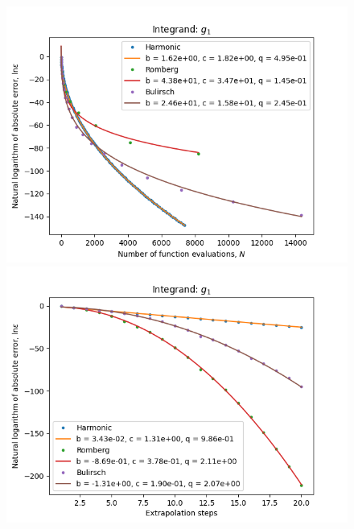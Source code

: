 \begin{figure}[H]
\centering
\begin{minipage}{0.45\textwidth}
\centering
\includegraphics[scale=0.45]{../results/romberg_plots/g_one_hp_trend.png}
\end{minipage}
\begin{minipage}{0.45\textwidth}
\centering
\includegraphics[scale=0.45]{../results/romberg_plots/g_one_hp_steps.png}
\end{minipage}
\end{figure}

